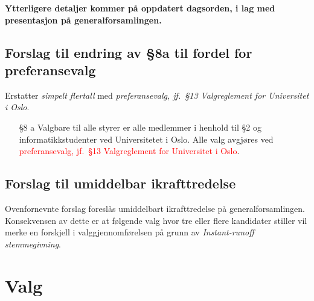 \documentclass[10pt,norsk,a4paper]{article}
\begin{document}
\textbf{Ytterligere detaljer kommer på oppdatert dagsorden, i lag med presentasjon på generalforsamlingen.}

\subsection{Forslag til endring av §8a til fordel for preferansevalg}

Erstatter \textit{simpelt flertall} med \textit{preferansevalg, jf.~§13 Valgreglement for Universitet i Oslo}.

\begin{enumerate}
	\item[§8 a] Valgbare til alle styrer er alle medlemmer i henhold til §2 og informatikkstudenter ved Universitetet i Oslo. Alle valg avgjøres ved \textcolor{red}{preferansevalg, jf.~§13 Valgreglement for Universitet i Oslo}.
\end{enumerate}

\subsection{Forslag til umiddelbar ikrafttredelse}

Ovenfornevnte forslag foreslås umiddelbart ikrafttredelse på generalforsamlingen.
Konsekvensen av dette er at følgende valg hvor tre eller flere kandidater stiller vil merke en forskjell i valggjennomførelsen på grunn av \textit{Instant-runoff stemmegivning}.



\section{Valg}
\end{document}
